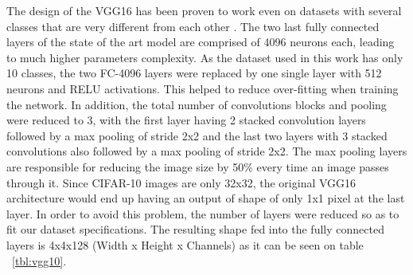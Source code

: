 The design of the VGG16 has been proven to work even on datasets with several classes that are very different from each other . The two last fully connected layers of the state of the art model are comprised of 4096 neurons each, leading to much higher parameters complexity. As the dataset used in this work has only 10 classes, the two FC-4096 layers were replaced by one single layer with 512 neurons and RELU activations. This helped to reduce over-fitting when training the network. In addition, the total number of convolutions blocks and pooling were reduced to 3, with the first layer having 2 stacked convolution layers followed by a max pooling of stride 2x2 and the last two layers with 3 stacked convolutions also followed by a max pooling of stride 2x2. The max pooling layers are responsible for reducing the image size by 50\% every time an image passes through it. Since CIFAR-10 images are only 32x32, the original VGG16 architecture would end up having an output of shape of only 1x1 pixel at the last layer. In order to avoid this problem, the number of layers were reduced so as to fit our dataset specifications. The resulting shape fed into the fully connected layers is 4x4x128 (Width x Height x Channels) as it can be seen on table ~\ref{tbl:vgg10}. 

